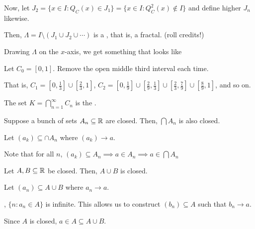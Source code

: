 \documentclass[class=pmath370,tikz,notes]{agony}
\begin{document}
Now, let $J_2 = \{x \in I : Q_C(x) \in J_1\} = \{x \in I : Q_C^2(x) \not\in I\}$
and define higher $J_n$ likewise.

Then, $\Lambda = I \setminus (J_1 \cup J_2 \cup \dotsb)$
is a , that is, a fractal. {\tiny (roll credits!)}

Drawing $\Lambda$ on the $x$-axis, we get something that looks like
\begin{center}
\end{center}


\begin{defn*}
  Let $C_0 = [0,1]$. Remove the open middle third interval each time.

  That is, $C_1 = [0,\frac13] \cup [\frac23,1]$,
  $C_2 = [0,\frac19] \cup [\frac29,\frac13] \cup [\frac23,\frac79] \cup [\frac89,1]$,
  and so on.

  The set $K = \bigcap_{n=1}^\infty C_n$ is the .
\end{defn*}

\begin{prop}
  Suppose a bunch of sets $A_n \subseteq \mathbb{R}$ are closed.
  Then, $\bigcap A_n$ is also closed.
\end{prop}
\begin{prf}
  Let $(a_k) \subseteq \cap A_n$ where $(a_k) \to a$.

  Note that for all $n$, $(a_k) \subseteq A_n \implies a \in A_n \implies a \in \bigcap A_n$
\end{prf}

\begin{prop}
  Let $A,B \subseteq \mathbb{R}$ be closed.
  Then, $A \cup B$ is closed.
\end{prop}
\begin{prf}
  Let $(a_n) \subseteq A \cup B$ where $a_n \to a$.

  \WLOG, $\{n : a_n \in A\}$ is infinite.
  This allows us to construct $(b_n) \subseteq A$ such that $b_n \to a$.

  Since $A$ is closed, $a \in A \subseteq A \cup B$.
\end{prf}
\end{document}
